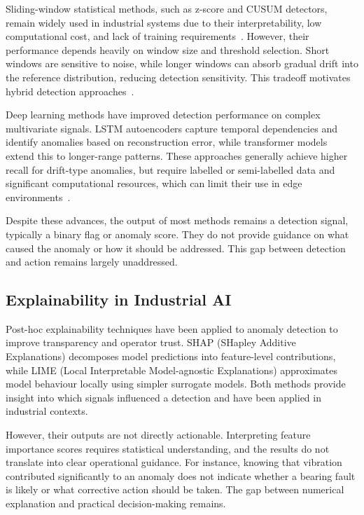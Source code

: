 \documentclass[11pt, a4paper]{article}
\begin{document}
Sliding-window statistical methods, such as z-score and CUSUM detectors, 
remain widely used in industrial systems due to their interpretability, 
low computational cost, and lack of training requirements~\cite{page1954continuous}. 
However, their performance depends heavily on window size and threshold 
selection. Short windows are sensitive to noise, while longer windows 
can absorb gradual drift into the reference distribution, reducing 
detection sensitivity. This tradeoff motivates hybrid detection 
approaches~\cite{bifet2007learning}.

Deep learning methods have improved detection performance on complex 
multivariate signals. LSTM autoencoders capture temporal dependencies 
and identify anomalies based on reconstruction error, while transformer 
models extend this to longer-range patterns. These approaches generally 
achieve higher recall for drift-type anomalies, but require labelled or 
semi-labelled data and significant computational resources, which can 
limit their use in edge environments~\cite{chandola2009anomaly}.

Despite these advances, the output of most methods remains a detection 
signal, typically a binary flag or anomaly score. They do not provide 
guidance on what caused the anomaly or how it should be addressed. This 
gap between detection and action remains largely unaddressed.

\subsection{Explainability in Industrial AI}

Post-hoc explainability techniques have been applied to anomaly detection 
to improve transparency and operator trust. SHAP (SHapley Additive 
Explanations) decomposes model predictions into feature-level 
contributions, while LIME (Local Interpretable Model-agnostic 
Explanations) approximates model behaviour locally using simpler 
surrogate models. Both methods provide insight into which signals 
influenced a detection and have been applied in industrial contexts.

However, their outputs are not directly actionable. Interpreting feature 
importance scores requires statistical understanding, and the results do 
not translate into clear operational guidance. For instance, knowing that 
vibration contributed significantly to an anomaly does not indicate 
whether a bearing fault is likely or what corrective action should be 
taken. The gap between numerical explanation and practical decision-making 
remains.
\end{document}

